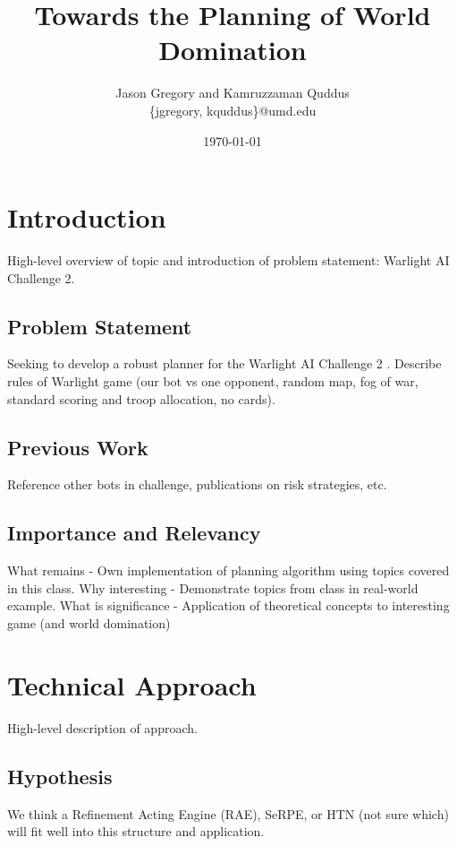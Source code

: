 \documentclass[a4paper,11pt]{article}
\begin{document}
\title{Towards the Planning of World Domination}
\author{Jason Gregory and Kamruzzaman Quddus \\ \{jgregory, kquddus\}@umd.edu}
\date{\today}

\maketitle

%

\section{Introduction}\label{sec:intro}
High-level overview of topic and introduction of problem statement: Warlight AI Challenge 2.

\subsection{Problem Statement}\label{sec:problem}
Seeking to develop a robust planner for the Warlight AI Challenge 2 \cite{warlight}.
Describe rules of Warlight game (our bot vs one opponent, random map, fog of war, standard scoring and troop allocation, no cards).

\subsection{Previous Work}\label{sec:previous}
Reference other bots in challenge, publications on risk strategies, etc.

\subsection{Importance and Relevancy}\label{sec:importance}
What remains - Own implementation of planning algorithm using topics covered in this class.
Why interesting - Demonstrate topics from class in real-world example.
What is significance - Application of theoretical concepts to interesting game (and world domination)

%
\section{Technical Approach}\label{sec:approach}
High-level description of approach.

\subsection{Hypothesis}\label{sec:hypothesis}
We think a Refinement Acting Engine (RAE), SeRPE, or HTN (not sure which) will fit well into this structure and application.
\end{document}
